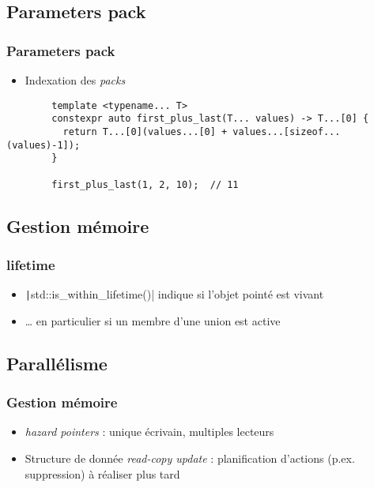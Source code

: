 \documentclass[C++.tex]{subfiles}
\begin{document}
\subsection*{Parameters pack}
\begin{frame}[fragile]
	\frametitle{Parameters pack}
	\begin{itemize}
		\item Indexation des \textit{packs}
	\end{itemize}

	\begin{verbatim}
		template <typename... T>
		constexpr auto first_plus_last(T... values) -> T...[0] {
		  return T...[0](values...[0] + values...[sizeof...(values)-1]);
		}

		first_plus_last(1, 2, 10);  // 11
	\end{verbatim}

\end{frame}

\subsection*{Gestion mémoire}
\begin{frame}[fragile]
	\frametitle{lifetime}
	\begin{itemize}
		\item \texttt|std::is_within_lifetime()| indique si l'objet pointé est vivant
		\item \ldots{} en particulier si un membre d'une union est active
	\end{itemize}

\end{frame}

\subsection*{Parallélisme}
\begin{frame}[fragile]
	\frametitle{Gestion mémoire}
	\begin{itemize}
		\item \textit{hazard pointers} : unique écrivain, multiples lecteurs
		\item Structure de donnée \textit{read-copy update} : planification d'actions (p.ex. suppression) à réaliser plus tard
	\end{itemize}

\end{frame}
\end{document}
